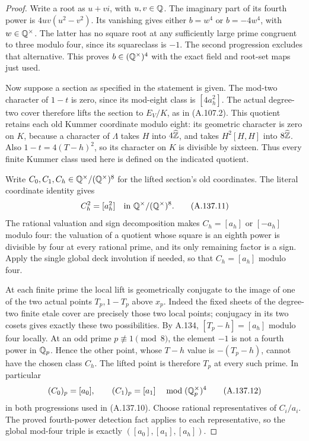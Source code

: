 \begin{proof}
Write a root as \(u+vi\), with \(u,v\in\mathbb Q\).
The imaginary part of its fourth power is
\(4uv(u^2-v^2)\).
Its vanishing gives either \(b=w^4\) or
\(b=-4w^4\), with \(w\in\mathbb Q^\times\).
The latter has no square root at any sufficiently
large prime congruent to three modulo four, since
its squareclass is \(-1\).
The second progression excludes that alternative.
This proves \(b\in(\mathbb Q^\times)^4\) with the exact
field and root-set maps just used.

Now suppose a section as specified in the statement
is given.  The mod-two character of \(1-t\) is zero,
since its mod-eight class is \([4a_h^2]\).
The actual degree-two cover therefore lifts the
section to \(E_V/K\), as in (A.107.2).
This quotient retains each old Kummer coordinate
modulo eight: its geometric character is zero on
\(K\), because a character of \(\Lambda\) takes
\(H\) into \(4\widehat{\mathbb Z}\), and takes
\(H^2[H,H]\) into \(8\widehat{\mathbb Z}\).
Also \(1-t=4(T-h)^2\), so its character on \(K\)
is divisible by sixteen.  Thus every finite Kummer
class used here is defined on the indicated quotient.

Write \(C_0,C_1,C_h\in\mathbb Q^\times/(\mathbb Q^\times)^8\)
for the lifted section's old coordinates.
The literal coordinate identity gives
\[
                    C_h^2=[a_h^2]
                       \quad\text{in }\mathbb Q^\times/(\mathbb Q^\times)^8.
\tag{A.137.11}
\]
The rational valuation and sign decomposition makes
\(C_h=[a_h]\) or \([-a_h]\) modulo four: the valuation
of a quotient whose square is an eighth power is
divisible by four at every rational prime, and its
only remaining factor is a sign.
Apply the single global deck involution if needed,
so that \(C_h=[a_h]\) modulo four.

At each finite prime the local lift is geometrically
conjugate to the image of one of the two actual points
\(T_p,1-T_p\) above \(x_p\).
Indeed the fixed sheets of the degree-two finite etale
cover are precisely those two local points; conjugacy
in its two cosets gives exactly these two possibilities.
By A.134, \([T_p-h]=[a_h]\) modulo four locally.
At an odd prime \(p\not\equiv1\pmod8\), the element
\(-1\) is not a fourth power in \(\mathbb Q_p\).
Hence the other point, whose \(T-h\) value is
\(-(T_p-h)\), cannot have the chosen class \(C_h\).
The lifted point is therefore \(T_p\) at every such
prime.  In particular
\[
                 (C_0)_p=[a_0],\qquad
                 (C_1)_p=[a_1]
                \quad\bmod (\mathbb Q_p^\times)^4
\tag{A.137.12}
\]
in both progressions used in (A.137.10).
Choose rational representatives of \(C_i/a_i\).
The proved fourth-power detection fact applies to
each representative, so the global mod-four triple
is exactly \(([a_0],[a_1],[a_h])\).


\end{proof}
